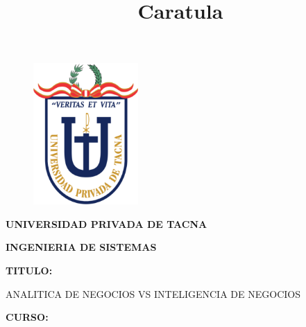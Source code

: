 \documentclass[12pt,letterpaper]{article}
\begin{document}
%


\title{Caratula}

\begin{titlepage}
\begin{center}
\begin{figure}[htb]
\begin{center}
\includegraphics[width=4cm]{./img/logo}
\end{center}
\end{figure}

\vspace*{0.15in}
\begin{Large}
\textbf{UNIVERSIDAD PRIVADA DE TACNA}\\
\end{Large}

\vspace*{0.1in}
\begin{Large}
\textbf{INGENIERIA DE SISTEMAS} \\
\end{Large}

\vspace*{0.5in}
\begin{Large}
\textbf{TITULO:}\\
\end{Large}

\vspace*{0.1in}
\begin{Large}
ANALITICA DE NEGOCIOS VS INTELIGENCIA DE NEGOCIOS \\
\end{Large}

\vspace*{0.3in}
\begin{Large}
\textbf{CURSO:} \\
\end{Large}


\end{center}
\end{titlepage}
\end{document}
